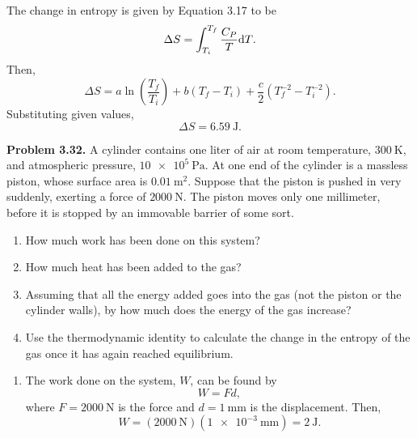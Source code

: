 \documentclass[a4paper, 12pt]{config/homework}
\begin{document}
\noindent
The change in entropy is given by Equation 3.17 to be
\[\Delta S = \int_{T_i}^{T_f}{\frac{C_P}{T} \text{d}T}.\]
Then,
\[\Delta S = a\ln\left(\frac{T_f}{T_i}\right) + b\left(T_f - T_i\right) + \frac{c}{2}\left(T^{-2}_f - T^{-2}_i\right).\]
Substituting given values,
\[\Delta S = \qty{6.59}{\joule}.\]


\pagebreak
\noindent
\textbf{Problem 3.32.} A cylinder contains one liter of air at room temperature, \(\qty{300}{\kelvin}\), and atmospheric pressure, \(\qty{10e5}{\Pa}\). At one end of the cylinder is a massless piston, whose surface area is \(\qty{0.01}{\meter\squared}\). Suppose that the piston is pushed in very suddenly, exerting a force of \(\qty{2000}{\newton}\). The piston moves only one millimeter, before it is stopped by an immovable barrier of some sort.
\begin{enumerate}[label=\textbf{(\alph*)}]
\item How much work has been done on this system?
\item How much heat has been added to the gas?
\item Assuming that all the energy added goes into the gas (not the piston or the cylinder walls), by how much does the energy of the gas increase?
\item Use the thermodynamic identity to calculate the change in the entropy of the gas once it has again reached equilibrium.
\end{enumerate}
\begin{enumerate}[label=\textbf{(\alph*)}]
\item The work done on the system, \(W\), can be found by
\[W = Fd,\]
where \(F=\qty{2000}{\newton}\) is the force and \(d=\qty{1}{\milli\meter}\) is the displacement. Then,
\[W = \left(\qty{2000}{\newton}\right)\left(\qty{1e-3}{\milli\meter}\right) = \qty{2}{\joule}.\]
\end{enumerate}
\end{document}
